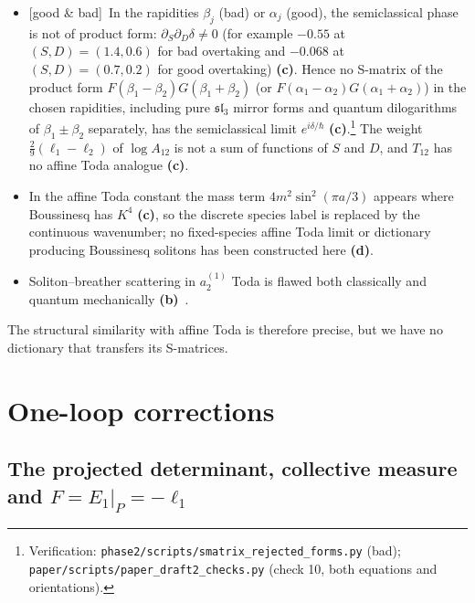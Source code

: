 \documentclass[11pt,a4paper]{article}
\newcommand{\lab}[1]{{\normalfont\sffamily\footnotesize\bfseries(#1)}}
\newcommand{\Lb}{\lab{b}}
\newcommand{\Lc}{\lab{c}}
\newcommand{\Ld}{\lab{d}}
\newcommand{\eqtag}[2]{{\normalfont\sffamily\footnotesize\textcolor{#1}{[#2]}}}
\newcommand{\Both}{\eqtag{violet!70!black}{good \& bad}}
\newcommand{\scr}[1]{\nolinkurl{#1}}
\newcommand{\chk}[1]{\footnote{\raggedright Verification: #1.}}
\newcommand{\hb}{\hbar}
\theoremstyle{remark}
\begin{document}
\begin{itemize}
\item \Both\ In the rapidities $\beta_j$ (bad) or $\alpha_j$ (good), the semiclassical phase is not of product form: $\partial_S\partial_D\delta\neq0$ (for example $-0.55$ at $(S,D)=(1.4,0.6)$ for bad overtaking and $-0.068$ at $(S,D)=(0.7,0.2)$ for good overtaking) \Lc. Hence no S-matrix of the product form $F(\beta_1-\beta_2)G(\beta_1+\beta_2)$ (or $F(\alpha_1-\alpha_2)G(\alpha_1+\alpha_2)$) in the chosen rapidities, including pure $\mathfrak{sl}_3$ mirror forms and quantum dilogarithms of $\beta_1\pm\beta_2$ separately, has the semiclassical limit $e^{i\delta/\hb}$ \Lc.\chk{\scr{phase2/scripts/smatrix_rejected_forms.py} (bad); \scr{paper/scripts/paper_draft2_checks.py} (check 10, both equations and orientations)} The weight $\tfrac29(\ell_1-\ell_2)$ of $\log A_{12}$ is not a sum of functions of $S$ and $D$, and $T_{12}$ has no affine Toda analogue \Lc.
\item In the affine Toda constant the mass term $4m^2\sin^2(\pi a/3)$ appears where Boussinesq has $K^4$ \Lc, so the discrete species label is replaced by the continuous wavenumber; no fixed-species affine Toda limit or dictionary producing Boussinesq solitons has been constructed here \Ld.
\item Soliton--breather scattering in $a_2^{(1)}$ Toda is flawed both classically and quantum mechanically \Lb~\cite{TW}.
\end{itemize}
The structural similarity with affine Toda is therefore precise, but we have no dictionary that transfers its S-matrices.

\section{One-loop corrections}\label{sec:oneloop}

\subsection{The projected determinant, collective measure and \texorpdfstring{$F=E_1|_P=-\ell_1$}{F = E\_1|\_P = -ell\_1}}\label{sec:projdet}
\end{document}
